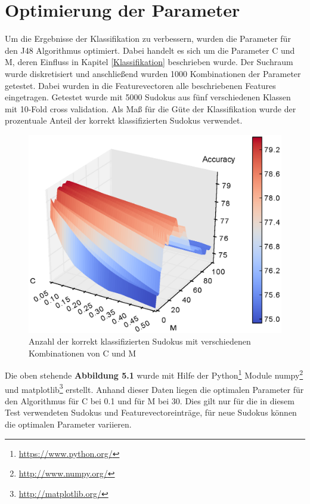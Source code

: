 \section{Optimierung der Parameter}
\label{Parameteroptimierung}
Um die Ergebnisse der Klassifikation zu verbessern, wurden die Parameter für den J48 Algorithmus optimiert. Dabei handelt es sich um die Parameter C und M, deren Einfluss in Kapitel \ref{Klassifikation} beschrieben wurde. Der Suchraum wurde diskretisiert und anschließend wurden 1000 Kombinationen der Parameter getestet. Dabei wurden in die Featurevectoren alle beschriebenen Features eingetragen. Getestet wurde mit 5000 Sudokus aus fünf verschiedenen Klassen mit 10-Fold cross validation. Als Maß für die Güte der Klassifikation wurde der prozentuale Anteil der korrekt klassifizierten Sudokus verwendet.

\begin{figure}[Hh]
    \includegraphics[width=\textwidth,height=\textheight,keepaspectratio]{./img/parameter.eps}
    \caption{Anzahl der korrekt klassifizierten Sudokus mit verschiedenen Kombinationen von C und M}
\end{figure}
Die oben stehende \textbf{Abbildung 5.1} wurde mit Hilfe der Python\footnote{\url{https://www.python.org/}} Module numpy\footnote{\url{http://www.numpy.org/}} und matplotlib\footnote{\url{http://matplotlib.org/}} erstellt.
Anhand dieser Daten liegen die optimalen Parameter für den Algorithmus für C bei 0.1 und für M bei 30. Dies gilt nur für die in diesem Test verwendeten Sudokus und Featurevectoreinträge, für neue Sudokus können die optimalen Parameter variieren.
